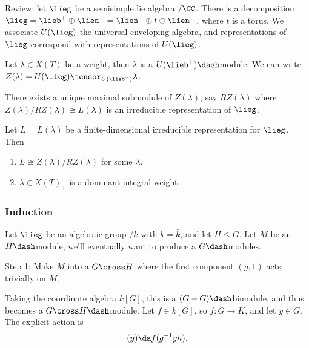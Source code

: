 Review: let \(\lieg\) be a semisimple lie algebra \(/\CC\). There is a
decomposition
\(\lieg = \lieb^+ \oplus \lien^- = \lien^+ \oplus t\oplus \lien^-\),
where \(t\) is a torus. We associate \(U(\lieg)\) the universal
enveloping algebra, and representations of \(\lieg\) correspond with
representations of \(U(\lieg)\).

Let \(\lambda \in X(T)\) be a weight, then \(\lambda\) is a
\(U(\lieb^+)\dash\)module. We can write
\(Z(\lambda) = U(\lieg) \tensor_{U(\lieb^+)} \lambda\).

\begin{remark}

There exists a unique maximal submodule of \(Z(\lambda)\), say
\(RZ(\lambda)\) where \(Z(\lambda)/RZ(\lambda) \cong L(\lambda)\) is an
irreducible representation of \(\lieg\).

\end{remark}

\begin{theorem}[?]

Let \(L = L(\lambda)\) be a finite-dimensional irreducible
representation for \(\lieg\). Then

\begin{enumerate}
\def\labelenumi{\arabic{enumi}.}
\tightlist
\item
  \(L \cong Z(\lambda)/RZ(\lambda)\) for some \(\lambda\).
\item
  \(\lambda \in X(T)_+\) is a dominant integral weight.
\end{enumerate}

\end{theorem}

\hypertarget{induction}{%
\subsubsection{Induction}\label{induction}}

Let \(\lieg\) be an algebraic group \(/k\) with \(k = \bar{k}\), and let
\(H \leq G\). Let \(M\) be an \(H\dash\)module, we'll eventually want to
produce a \(G\dash\)modules.

Step 1: Make \(M\) into a \(G\cross H\) where the first component
\((g, 1)\) acts trivially on \(M\).

Taking the coordinate algebra \(k[G]\), this is a
\((G-G)\dash\)bimodule, and thus becomes a \(G\cross H\dash\)module. Let
\(f\in k[G]\), so \(f:G\to K\), and let \(y\in G\). The explicit action
is
\begin{align*}  
[(g, h) f] (y) \da f(g^{-1} y h)
.\end{align*}

